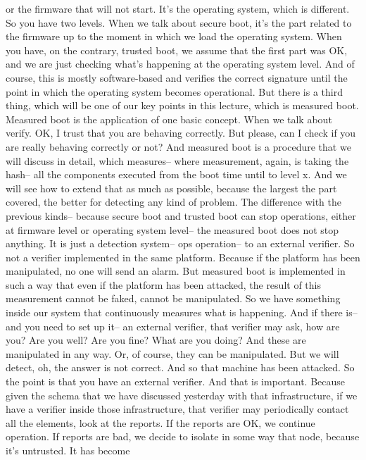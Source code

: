  or the firmware that will not start. It's the operating system, which is
 different. So you have two levels. When we talk about secure boot, it's the
 part related to the firmware up to the moment in which we load the operating
 system. When you have, on the contrary, trusted boot, we assume that the first
 part was OK, and we are just checking what's happening at the operating system
 level. And of course, this is mostly software-based and verifies the correct
 signature until the point in which the operating system becomes operational.
 But there is a third thing, which will be one of our key points in this
 lecture, which is measured boot. Measured boot is the application of one basic
 concept. When we talk about verify. OK, I trust that you are behaving
 correctly. But please, can I check if you are really behaving correctly or
 not? And measured boot is a procedure that we will discuss in detail, which
 measures-- where measurement, again, is taking the hash-- all the components
 executed from the boot time until to level x. And we will see how to extend
 that as much as possible, because the largest the part covered, the better for
 detecting any kind of problem. The difference with the previous kinds--
 because secure boot and trusted boot can stop operations, either at firmware
 level or operating system level-- the measured boot does not stop anything. It
 is just a detection system-- ops operation-- to an external verifier. So not a
 verifier implemented in the same platform. Because if the platform has been
 manipulated, no one will send an alarm. But measured boot is implemented in
 such a way that even if the platform has been attacked, the result of this
 measurement cannot be faked, cannot be manipulated. So we have something
 inside our system that continuously measures what is happening. And if there
 is-- and you need to set up it-- an external verifier, that verifier may ask,
 how are you? Are you well? Are you fine? What are you doing? And these are
 manipulated in any way. Or, of course, they can be manipulated. But we will
 detect, oh, the answer is not correct. And so that machine has been attacked.
 So the point is that you have an external verifier. And that is important.
 Because given the schema that we have discussed yesterday with that
 infrastructure, if we have a verifier inside those infrastructure, that
 verifier may periodically contact all the elements, look at the reports. If
 the reports are OK, we continue operation. If reports are bad, we decide to
 isolate in some way that node, because it's untrusted. It has become
